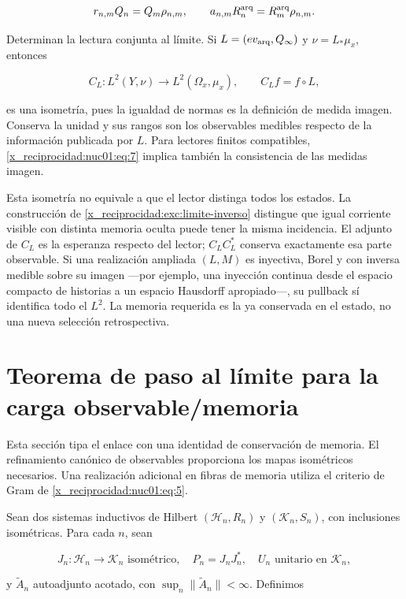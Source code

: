 \begin{equation}
r_{n,m}Q_n=Q_m\rho_{n,m},\qquad
a_{n,m}R^{\rm arq}_n=R^{\rm arq}_m\rho_{n,m}.
\label{x_reciprocidad:nuc01:eq:7}
\end{equation}

Determinan la lectura conjunta al límite. Si \(L=(\operatorname{ev}_{\rm arq},Q_\infty)\) y \(\nu=L_*\mu_x\), entonces

\[
C_L:L^2(Y,\nu)\longrightarrow L^2(\Omega_x,\mu_x),
\qquad C_Lf=f\circ L,
\]

es una isometría, pues la igualdad de normas es la definición de medida imagen. Conserva la unidad y sus rangos son los observables medibles respecto de la información publicada por \(L\). Para lectores finitos compatibles, \eqref{x_reciprocidad:nuc01:eq:7} implica también la consistencia de las medidas imagen.

Esta isometría no equivale a que el lector distinga todos los estados. La construcción de \cref{x_reciprocidad:exc:limite-inverso} distingue que igual corriente visible con distinta memoria oculta puede tener la misma incidencia. El adjunto de \(C_L\) es la esperanza respecto del lector; \(C_LC_L^*\) conserva exactamente esa parte observable. Si una realización ampliada \((L,M)\) es inyectiva, Borel y con inversa medible sobre su imagen —por ejemplo, una inyección continua desde el espacio compacto de historias a un espacio Hausdorff apropiado—, su pullback sí identifica todo el \(L^2\). La memoria requerida es la ya conservada en el estado, no una nueva selección retrospectiva.

\section{Teorema de paso al límite para la carga observable/memoria}

Esta sección tipa el enlace con una identidad de conservación de memoria. El refinamiento canónico de observables proporciona los mapas isométricos necesarios. Una realización adicional en fibras de memoria utiliza el criterio de Gram de \eqref{x_reciprocidad:nuc01:eq:5}.

Sean dos sistemas inductivos de Hilbert \((\mathscr H_n,R_n)\) y \((\mathscr K_n,S_n)\), con inclusiones isométricas. Para cada \(n\), sean

\[
J_n:\mathscr H_n\to\mathscr K_n\text{ isométrico},\quad
P_n=J_nJ_n^*,\quad U_n\text{ unitario en }\mathscr K_n,
\]

y \(\widetilde A_n\) autoadjunto acotado, con \(\sup_n\|\widetilde A_n\|<\infty\). Definimos

